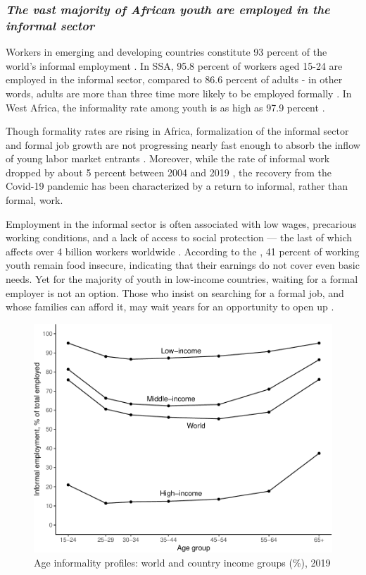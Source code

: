 \documentclass[
  a4paper, twoside, 12pt]{book}
\begin{document}
\hypertarget{the-vast-majority-of-african-youth-are-employed-in-the-informal-sector}{%
\subsubsection*{\texorpdfstring{\emph{The vast majority of African youth are employed in the informal sector}}{The vast majority of African youth are employed in the informal sector}}\label{the-vast-majority-of-african-youth-are-employed-in-the-informal-sector}}

Workers in emerging and developing countries constitute 93 percent of the world's informal employment \autocite{bonnet2018}. In SSA, 95.8 percent of workers aged 15-24 are employed in the informal sector, compared to 86.6 percent of adults - in other words, adults are more than three time more likely to be employed formally \autocite{kiaga2020}. In West Africa, the informality rate among youth is as high as 97.9 percent \autocite{bonnet2018}.

Though formality rates are rising in Africa, formalization of the informal sector and formal job growth are not progressing nearly fast enough to absorb the inflow of young labor market entrants \autocite{filmer2014}. Moreover, while the rate of informal work dropped by about 5 percent between 2004 and 2019 \autocite{ilo2023}, the recovery from the Covid-19 pandemic has been characterized by a return to informal, rather than formal, work.

Employment in the informal sector is often associated with low wages, precarious working conditions, and a lack of access to social protection --- the last of which affects over 4 billion workers worldwide \autocite{ilo2023a}. According to the \textcite{africandevelopmentbank2016a}, 41 percent of working youth remain food insecure, indicating that their earnings do not cover even basic needs. Yet for the majority of youth in low-income countries, waiting for a formal employer is not an option. Those who insist on searching for a formal job, and whose families can afford it, may wait years for an opportunity to open up \autocite{serneels2007,manacorda2017}.

\begin{figure}[H]
\includegraphics[width=0.8\linewidth,]{figures/fig-inf-1} \caption{Age informality profiles: world and country income groups (\%), 2019}\label{fig:fig-inf}
\end{figure}
\end{document}
